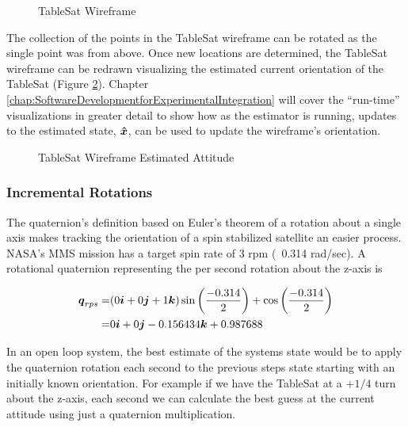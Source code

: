 \begin{figure}[H]
  \centerline{}
  \caption{TableSat Wireframe}
  \label{fig:TSatWireframe}
\end{figure}

The collection of the points in the TableSat wireframe can be rotated as the single point was from above.  Once new locations are determined, the TableSat wireframe can be redrawn visualizing the estimated current orientation of the TableSat (Figure \ref{fig:TSatWireframeEstimatedAttitude}).  Chapter \ref{chap:SoftwareDevelopmentforExperimentalIntegration} will cover the ``run-time'' visualizations in greater detail to show how as the estimator is running, updates to the estimated state, $\boldsymbol{\hat{x}}$, can be used to update the wireframe's orientation.

\begin{figure}[H]
  \centerline{}
  \caption{TableSat Wireframe Estimated Attitude}
  \label{fig:TSatWireframeEstimatedAttitude}
\end{figure}


\subsubsection{Incremental Rotations}
\label{subsubsec:IncrementalRotations}

The quaternion's definition based on Euler's theorem of a rotation about a single axis makes tracking the orientation of a spin stabilized satellite an easier process.  NASA's MMS mission has a target spin rate of 3 rpm (~0.314 rad/sec).  A rotational quaternion representing the per second rotation about the z-axis is

\begin{equation}
  \begin{aligned}
    \boldsymbol{q}_{rps} = & ( 0\boldsymbol{i} + 0\boldsymbol{j} + 1\boldsymbol{k} ) \sin \left( \frac{-0.314}{2} \right) + \cos \left( \frac{-0.314}{2} \right) \\
    = & 0\boldsymbol{i} +0\boldsymbol{j} -0.156434\boldsymbol{k} + 0.987688
  \end{aligned}
\end{equation}

In an open loop system, the best estimate of the systems state would be to apply the quaternion rotation each second to the previous steps state starting with an initially known orientation.  For example if we have the TableSat at a $+1/4$ turn about the z-axis, each second we can calculate the best guess at the current attitude using just a quaternion multiplication.


